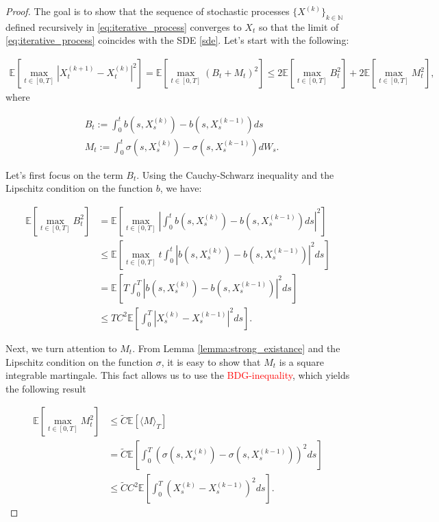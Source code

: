 \documentclass{article}
\begin{document}
\begin{proof}
The goal is to show that the sequence of stochastic processes $\{X^{(k)}\}_{k\in\mathbb{N}}$ defined recursively in \eqref{eq:iterative_process} converges to $X_t$ so that the limit of \eqref{eq:iterative_process} coincides with the SDE \eqref{sde}. Let's start with the following: 

\begin{equation*}
\begin{aligned}
\mathbb{E}\left[\max_{t\in[0,T]}|X^{(k+1)}_t-X^{(k)}_t|^2\right]=\mathbb{E}\left[\max_{t\in[0,T]}(B_t+M_t)^2\right]\leq2\mathbb{E}\left[\max_{t\in[0,T]}B_t^2\right] + 2\mathbb{E}\left[\max_{t\in[0,T]}M_t^2\right],
\end{aligned}
\end{equation*}
where

\begin{equation*}
\begin{aligned}
&B_t:=\int_0^tb(s,X^{(k)}_s)-b(s,X^{(k-1)}_s)ds\\
&M_t:=\int_0^t\sigma(s,X^{(k)}_s)-\sigma(s,X^{(k-1)}_s)dW_s.
\end{aligned}
\end{equation*}

Let's first focus on the term $B_t$. Using the Cauchy-Schwarz inequality and the Lipschitz condition on the function $b$, we have:

\begin{equation*}
\begin{aligned}
\mathbb{E}\left[\max_{t\in[0,T]}B_t^2\right]&=\mathbb{E}\left[\max_{t\in[0,T]}|\int_0^tb(s,X^{(k)}_s)-b(s,X^{(k-1)}_s)ds|^2\right]\\
&\leq\mathbb{E}\left[\max_{t\in[0,T]}t\int_0^t|b(s,X^{(k)}_s)-b(s,X^{(k-1)}_s)|^2ds\right]\\
&=\mathbb{E}\left[T\int_0^T|b(s,X^{(k)}_s)-b(s,X^{(k-1)}_s)|^2ds\right]\\
&\leq TC^2\mathbb{E}\left[\int_0^T|X^{(k)}_s-X^{(k-1)}_s|^2ds\right].
\end{aligned}
\end{equation*}

Next, we turn attention to $M_t$. From Lemma \ref{lemma:strong_existance} and the Lipschitz condition on the function $\sigma$, it is easy to show that $M_t$ is a square integrable martingale. This fact allows us to use the \textcolor{red}{BDG-inequality}, which yields the following result

\begin{equation*}
\begin{aligned}
\mathbb{E}\left[\max_{t\in[0,T]}M_t^2\right]&\leq\tilde{C}\mathbb{E}[\langle M\rangle_T]\\
&=\tilde{C}\mathbb{E}\left[\int_0^T(\sigma(s,X^{(k)}_s)-\sigma(s,X^{(k-1)}_s))^2ds\right]\\
&\leq\tilde{C}C^2\mathbb{E}\left[\int_0^T(X_s^{(k)}-X_s^{(k-1)})^2ds\right].
\end{aligned}
\end{equation*}


\end{proof}
\end{document}
